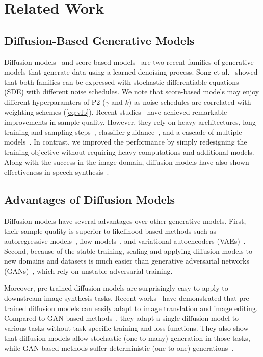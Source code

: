 \section{Related Work}
\label{sec:related}

\subsection{Diffusion-Based Generative Models}
Diffusion models~\cite{sohl2015deep,ho2020denoising,nichol2021improved,dhariwal2021diffusion} and score-based models~\cite{song2019generative,song2020score} are two recent families of generative models that generate data using a learned denoising process. Song et al.~\cite{song2020score} showed that both families can be expressed with stochastic differentiable equations (SDE) with different noise schedules. We note that score-based models may enjoy different hyperparamters of P2 ($\gamma$ and $k$) as noise schedules are correlated with weighting schemes (\cref{eq:vlb}).
Recent studies~\cite{saharia2021image,dhariwal2021diffusion,song2020score} have achieved remarkable improvements in sample quality. However, they rely on heavy architectures, long training and sampling steps~\cite{song2020score}, classifier guidance~\cite{dhariwal2021diffusion}, and a cascade of multiple models~\cite{saharia2021image}. In contrast, we improved the performance by simply redesigning the training objective without requiring heavy computations and additional models. Along with the success in the image domain, diffusion models have also shown effectiveness in speech synthesis~\cite{kong2020diffwave,chen2020wavegrad}.

\subsection{Advantages of Diffusion Models}

Diffusion models have several advantages over other generative models. First, their sample quality is superior to likelihood-based methods such as autoregressive models~\cite{salimans2017pixelcnn++,oord2016conditional}, flow models~\cite{dinh2014nice,dinh2016density}, and variational autoencoders (VAEs)~\cite{kingma2013auto}. Second, because of the stable training, scaling and applying diffusion models to new domains and datasets is much easier than generative adversarial networks (GANs)~\cite{goodfellow2014generative}, which rely on unstable adversarial training. 

Moreover, pre-trained diffusion models are surprisingly easy to apply to downstream image synthesis tasks.
Recent works~\cite{choi2021ilvr,meng2021sdedit} have demonstrated that pre-trained diffusion models can easily adapt to image translation and image editing. Compared to GAN-based methods~\cite{isola2017image,zhu2017unpaired,abdal2019image2stylegan}, they adapt a single diffusion model to various tasks without task-specific training and loss functions. They also show that diffusion models allow stochastic (one-to-many) generation in those tasks, while GAN-based methods suffer deterministic (one-to-one) generations~\cite{isola2017image}. 


